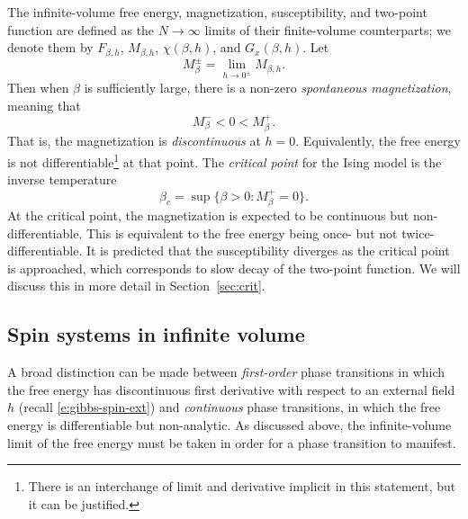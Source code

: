 The infinite-volume free energy, magnetization, susceptibility, and two-point function
are defined as the $N\to\infty$ limits of their finite-volume counterparts; we denote them by
$F_{\beta,h}$, $M_{\beta,h}$, $\chi(\beta, h)$, and $G_x(\beta, h)$.
Let
\begin{equation}
M^\pm_{\beta} = \lim_{h\to0^\pm} M_{\beta,h}.
\end{equation}
Then when $\beta$ is sufficiently large, there is a non-zero \emph{spontaneous magnetization},
meaning that
\begin{equation}
M^-_\beta < 0 < M^+_\beta.
\end{equation}
That is, the magnetization is \emph{discontinuous} at $h = 0$. Equivalently, the free energy
is not differentiable\footnote{There is an interchange of limit and derivative implicit in
this statement, but it can be justified.} at that point. The \emph{critical point} for the
Ising model is the inverse temperature
\begin{equation}
\beta_c = \sup\{\beta > 0 : M^+_\beta = 0 \}.
\end{equation}
At the critical point, the magnetization is expected to be continuous but non-differentiable.
This is equivalent to the free energy being once- but not twice-differentiable.
It is predicted that the
susceptibility diverges as the critical point is approached, which corresponds to slow decay
of the two-point function. We will discuss this in more detail in Section~\ref{sec:crit}.


\subsection{Spin systems in infinite volume}

A broad distinction can be made between \emph{first-order} phase transitions
in which the
free energy has discontinuous first derivative with respect to an external
field $h$ (recall \eqref{e:gibbs-spin-ext}) and \emph{continuous} phase
transitions, in which the free energy is differentiable but non-analytic.
As discussed above, the infinite-volume limit of the free energy must be taken
in order for a phase transition to manifest.


